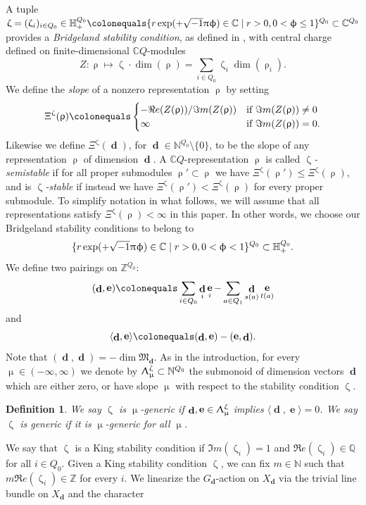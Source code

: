 \documentclass[a4paper,10pt]{amsart}
\renewcommand{\zeta}{\upzeta}
\renewcommand{\pi}{\uppi\hspace{0.05em}}
\renewcommand{\rho}{\uprho}
\renewcommand{\Lambda}{\Uplambda}
\renewcommand{\phi}{\upphi}
\renewcommand{\mu}{\upmu}
\newtheorem{definition}[theorem]{Definition}
\newcommand{\Mu}{\Xi}
\newcommand{\Mst}{\mathfrak{M}}
\DeclareMathOperator{\dd}{\mathbf{d}}
\DeclareMathOperator{\ee}{\mathbf{e}}
\begin{document}
\smallbreak
A tuple $\zeta=(\zeta_i)_{i\in Q_0}\in \mathbb{H}_+^{Q_0}\colonequals \{r\exp(+\sqrt{-1}\pi\phi)\in \mathbb{C}\mid r>0, 0<\phi\le 1\}^{Q_0}\subset \mathbb{C}^{Q_0}$ provides a \textit{Bridgeland stability condition}, as defined in \cite{Bridgeland02}, with central charge defined on finite-dimensional $\mathbb{C}Q$-modules
\[
Z\colon\rho\mapsto\zeta\cdot \dim (\rho)=\sum_{i\in Q_0}\zeta_i\dim (\rho_i).  
\]
We define the \textit{slope} of a nonzero representation $\rho$ by setting 
\[
\Mu^{\zeta}(\rho)\colonequals\begin{cases}- \Re e (Z(\rho))/ \Im m (Z(\rho))&\textrm{if }\Im m (Z(\rho))\neq 0\\\infty&\textrm{if }\Im m (Z(\rho))=0.\end{cases}
\]
Likewise we define $\Mu^{\zeta}(\dd)$, for $\dd\in\mathbb{N}^{Q_0}\setminus\{0\}$, to be the slope of any representation $\rho$ of dimension $\dd$.  A $\mathbb{C} Q$-representation $\rho$ is called $\zeta$\textit{-semistable} if for all proper submodules $\rho'\subset\rho$ we have $\Mu^{\zeta}(\rho')\leq\Mu^{\zeta}(\rho)$, and is $\zeta$\textit{-stable} if instead we have $\Mu^{\zeta}(\rho')<\Mu^{\zeta}(\rho)$ for every proper submodule.  To simplify notation in what follows, we will assume that all representations satisfy $\Mu^{\zeta}(\rho)<\infty$ in this paper.  In other words, we choose our Bridgeland stability conditions to belong to 
\[
\{r\exp(+\sqrt{-1}\pi\phi)\in \mathbb{C}\mid r>0, 0<\phi< 1\}^{Q_0}\subset\mathbb{H}_+^{Q_0}.
\]
\smallbreak
We define two pairings on $\mathbb{Z}^{Q_0}$:
\begin{equation*}
(\dd,\ee)\colonequals \sum_{i\in Q_0} \dd_i \ee_i-\sum_{a\in Q_1}\dd_{s(a)}\ee_{t(a)}
\end{equation*}
and
\begin{equation*}
\langle \dd,\ee\rangle\colonequals (\dd,\ee)-(\ee,\dd).
\end{equation*}
Note that $(\dd,\dd)=-\dim \Mst_{\dd}$.
\smallbreak
As in the introduction, for every $\mu\in (-\infty,\infty)$ we denote by $\Lambda_{\mu}^{\zeta}\subset\mathbb{N}^{Q_0}$ the submonoid of dimension vectors $\dd$ which are either zero, or have slope $\mu$ with respect to the stability condition $\zeta$.
\begin{definition}
\label{genericityDef}
We say $\zeta$ is $\mu$-generic if $\dd,\ee\in\Lambda_{\mu}^{\zeta}$ implies $\langle \dd,\ee\rangle=0$.  We say $\zeta$ is generic if it is $\mu$-generic for all $\mu$.  
\end{definition}
We say that $\zeta$ is a King stability condition if $\Im m(\zeta_i)=1$ and $\Re e(\zeta_i)\in\mathbb{Q}$ for all $i\in Q_0$.  Given a King stability condition $\zeta$, we can fix $m\in\mathbb{N}$ such that $m\Re e(\zeta_i)\in\mathbb{Z}$ for every $i$.  We linearize the $G_{\dd}$-action on $X_{\dd}$ via the trivial line bundle on $X_{\dd}$ and the character 
\end{document}
